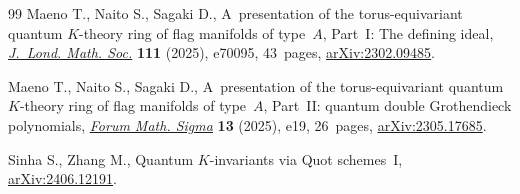 \documentclass[11pt]{article}
\numberwithin{equation}{section}
\numberwithin{equation}{section}
\theoremstyle{definition}
\begin{document}
\begin{thebibliography}{99}
Maeno T., Naito S., Sagaki D., A~presentation of the torus-equivariant quantum
 {$K$}-theory ring of flag manifolds of type~{$A$}, {P}art~{I}: {T}he defining
 ideal, \href{https://doi.org/10.1112/jlms.70095}{\textit{J.~Lond. Math.
 Soc.}} \textbf{111} (2025), e70095, 43~pages,
 \href{http://arxiv.org/abs/2302.09485}{arXiv:2302.09485}.

Maeno T., Naito S., Sagaki D., A~presentation of the torus-equivariant quantum
 {$K$}-theory ring of flag manifolds of type~{$A$}, {P}art~{II}: quantum
 double {G}rothendieck polynomials,
 \href{https://doi.org/10.1017/fms.2024.147}{\textit{Forum Math. Sigma}}
 \textbf{13} (2025), e19, 26~pages,
 \href{http://arxiv.org/abs/2305.17685}{arXiv:2305.17685}.

Sinha S., Zhang M., Quantum $K$-invariants via {Q}uot schemes~{I},
 \href{http://arxiv.org/abs/2406.12191}{arXiv:2406.12191}.

\end{thebibliography}
\end{document}
